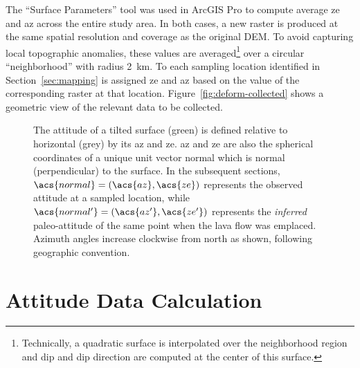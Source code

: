 The ``Surface Parameters'' tool was used in ArcGIS Pro to compute average \acf{ze} and \acf{az} across the entire study area. In both cases, a new raster is produced at the same spatial resolution and coverage as the original \ac{DEM}. To avoid capturing local topographic anomalies, these values are averaged\footnote{Technically, a quadratic surface is interpolated over the neighborhood region and dip and dip direction are computed at the center of this surface.} over a circular ``neighborhood'' with radius \qty{2}{\km}. To each sampling location identified in Section~\ref{sec:mapping} is assigned \acf{ze} and \acf{az} based on the value of the corresponding raster at that location. Figure~\ref{fig:deform-collected} shows a geometric view of the relevant data to be collected.

\begin{figure}
    {\caption[Surface attitude as a normal vector $\acs{normal}=(\acs{az},\acs{ze})$]{The attitude of a tilted surface (green) is defined relative to horizontal (grey) by its \acf{az} and \acf{ze}. \acs{az} and \acs{ze} are also the spherical coordinates of a unique unit vector \acs{normal} which is normal (perpendicular) to the surface. In the subsequent sections, $\acs{normal}=(\acs{az},\acs{ze})$ represents the observed attitude at a sampled location, while $\acs{normal'}=(\acs{az'},\acs{ze'})$ represents the \emph{inferred} paleo-attitude of the same point when the lava flow was emplaced. Azimuth angles increase clockwise from \acf{north} as shown, following geographic convention.}\label{fig:surface}}
    {}
\end{figure}

\section{Attitude Data Calculation}\label{sec:calculation}
